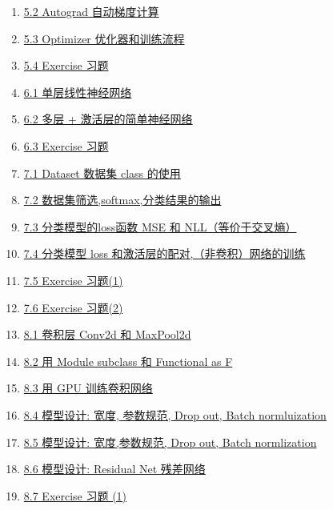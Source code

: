 \documentclass[11pt]{article}
\begin{document}
\begin{enumerate}
	\item \href{https://mp.weixin.qq.com/s/1araRBCpR6tGiV4cWTM2bA}{5.2 Autograd 自动梯度计算}	%
	\item \href{https://mp.weixin.qq.com/s/qNmnJ3EGPrczZNNZTH6yJQ}{5.3 Optimizer 优化器和训练流程}	%
	\item \href{https://mp.weixin.qq.com/s/7G8jrxUq-aMI7K3qTrD03A}{5.4 Exercise 习题}	%
	\item \href{https://mp.weixin.qq.com/s/SEPqSD9W3HnEeuU6IcxQYQ}{6.1 单层线性神经网络}	%
	\item \href{https://mp.weixin.qq.com/s/0DHIJdzxWAgtusqxZqeg2g}{6.2 多层 + 激活层的简单神经网络}	%
	\item \href{https://mp.weixin.qq.com/s/2V68bVVr7Gi05LqOdHgsOw}{6.3 Exercise 习题}	%
	\item \href{https://mp.weixin.qq.com/s/wcKFTXTyU9szEacaLhGOVw}{7.1 Dataset 数据集 class 的使用}	%
	\item \href{https://mp.weixin.qq.com/s/tpRiT0r6xMwzXLdo767r3g}{7.2 数据集筛选,softmax,分类结果的输出}	%
	\item \href{https://mp.weixin.qq.com/s/BMEFM9wVRWp-maQJ7_6yTw}{7.3 分类模型的loss函数 MSE 和 NLL（等价于交叉熵）}	%
	\item \href{https://mp.weixin.qq.com/s/mZNcLjRIGuRSrwCxOIQYXg}{7.4 分类模型 loss 和激活层的配对,（非卷积）网络的训练}	%
	\item \href{https://mp.weixin.qq.com/s/DWgyqaFd1L3tHoCsAqo1vQ}{7.5 Exercise 习题(1)}	%
	\item \href{https://mp.weixin.qq.com/s/DNTQYi2QUf60zEginb5JBw}{7.6 Exercise 习题(2)}	%
	\item \href{https://mp.weixin.qq.com/s/ofXwMlSUQXdFux9htN7vxw}{8.1 卷积层 Conv2d 和 MaxPool2d}	%
	\item \href{https://mp.weixin.qq.com/s/PPk6EJce2Yfd_jca-3vDng}{8.2 用 Module subclass 和 Functional as F}	%
	\item \href{https://mp.weixin.qq.com/s/TObOqNRdj6A88IQ7Oo--3Q}{8.3 用 GPU 训练卷积网络}	%
	\item \href{https://mp.weixin.qq.com/s/qZUymw_5mMcYokXEhejfhg}{8.4 模型设计: 宽度, 参数规范, Drop out, Batch normluization}	%
	\item \href{https://mp.weixin.qq.com/s/HI79ymNktyr3l77zzX53Og}{8.5 模型设计: 宽度,参数规范, Drop out, Batch normlization}	%
	\item \href{https://mp.weixin.qq.com/s/zodvZnERtHC226Dqr1C_dw}{8.6 模型设计: Residual Net 残差网络}	%
	\item \href{https://mp.weixin.qq.com/s/y2dBbP3hY0uNa_5bHY0XSQ}{8.7 Exercise 习题 (1)}	%

\end{enumerate}
\end{document}
